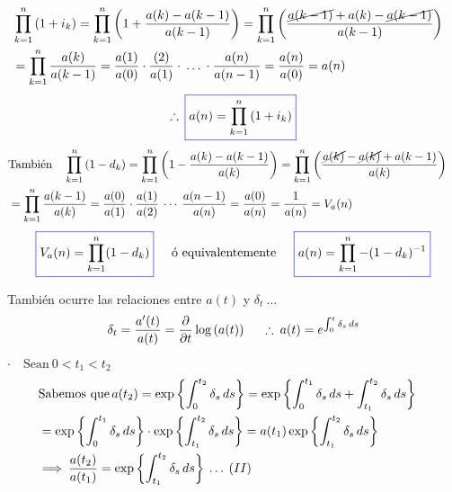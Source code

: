 \begin{remark}
\begin{align*}
&\prod_{k=1}^{n} \left(1 + i_k \right) = \prod_{k=1}^{n} \left(1 + \frac{a(k) - a(k-1)}{a(k-1)} \right) = \prod_{k=1}^{n} \left(\frac{\cancel{a(k-1)} + a(k) - \cancel{a(k-1)}}{a(k-1)} \right)&\\
&= \prod_{k=1}^{n} \frac{a(k)}{a(k-1)} = \frac{a(1)}{a(0)} \cdot \frac{(2)}{a(1)} \cdot \: \ldots \: \cdot \frac{a(n)}{a(n-1)} = \frac{a(n)}{a(0)} = a(n)&
\end{align*}
$$ \therefore \: \color{blue}\boxed{\color{black} a(n) = \prod_{k=1}^{n} \left( 1+i_k\right) }$$
\begin{align*}
&\text{También} \quad \prod_{k=1}^{n}\left(1-d_k \right) = \prod_{k=1}^{n} \left(1 - \frac{a(k) -a(k-1)}{a(k)}\right) = \prod_{k=1}^{n} \left(\frac{\cancel{a(k)} - \cancel{a(k)} + a(k-1)}{a(k)} \right)   &\\
&= \prod_{k=1}^{n} \frac{a(k-1)}{a(k)}= \frac{a(0)}{a(1)} \cdot \frac{a(1)}{a(2)} \: \cdots \: \frac{a(n-1)}{a(n)} = \frac{a(0)}{a(n)} = \frac{1}{a(n)} = V_a(n)&
\end{align*}
$$\color{blue}\boxed{\color{black}V_a(n)=\prod_{k=1}^{n} (1-d_k)} \hspace{0.5cm} \color{black}\text{ó equivalentemente} \hspace{0.5cm} \color{blue}\boxed{\color{black}a(n)=\prod_{k=1}^{n} -(1-d_k)^{-1}}$$
\end{remark}

También ocurre las relaciones entre $a(t)$ y $\delta_t \: \ldots$ 
$$\delta_t = \frac{a'(t)}{a(t)} = \frac{\partial}{\partial t} \log\left( a(t) \right) \hspace{0.5cm} \therefore \: a(t) = e^{\int_{0}^{t} \delta_s \, ds}$$

$\cdot \quad \text{Sean} \: 0<t_1<t_2$
\begin{align*}
&\text{Sabemos que} \, a(t_2) = \exp\left\lbrace \integral{0}{t_2}{\delta_s}{s} \right\rbrace = \exp\left\lbrace \integral{0}{t_1}{\delta_s}{s} + \integral{t_1}{t_2}{\delta_s}{s} \right\rbrace &\\
&=\exp\left\lbrace \integral{0}{t_1}{\delta_s}{s}\right\rbrace \cdot \exp\left\lbrace \integral{t_1}{t_2}{\delta_s}{s} \right\rbrace = a(t_1)\exp\left\lbrace \integral{t_1}{t_2}{\delta_s}{s}\right\rbrace &\\
&\Longrightarrow \: \frac{a(t_2)}{a(t_1)} = \exp\left\lbrace \integral{t_1}{t_2}{\delta_s}{s}\right\rbrace \: \ldots \: (\MakeUppercase{\romannumeral 2})&
\end{align*}

